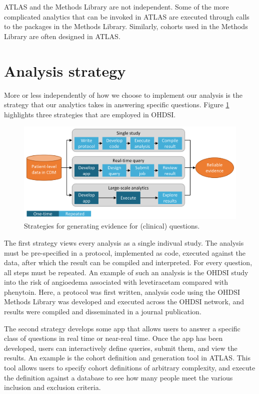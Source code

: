 \documentclass[11pt]{book}
\begin{document}
ATLAS and the Methods Library are not independent. Some of the more
complicated analytics that can be invoked in ATLAS are executed through
calls to the packages in the Methods Library. Similarly, cohorts used in
the Methods Library are often designed in ATLAS.

\section{Analysis strategy}\label{analysis-strategy}

More or less independently of how we choose to implement our analysis is
the strategy that our analytics takes in answering specific questions.
Figure \ref{fig:strategies} highlights three strategies that are
employed in OHDSI.

\begin{figure}

{\centering \includegraphics[width=0.9\linewidth]{images/OhdsiAnalyticsTools/strategies} 

}

\caption{Strategies for generating evidence for (clinical) questions.}\label{fig:strategies}
\end{figure}

The first strategy views every analysis as a single indivual study. The
analysis must be pre-specified in a protocol, implemented as code,
executed against the data, after which the result can be compiled and
interpreted. For every question, all steps must be repeated. An example
of such an analysis is the OHDSI study into the risk of angioedema
associated with levetiracetam compared with phenytoin. \citep{duke_2017}
Here, a protocol was first written, analysis code using the OHDSI
Methods Library was developed and executed across the OHDSI network, and
results were compiled and disseminated in a journal publication.

The second strategy develops some app that allows users to answer a
specific class of questions in real time or near-real time. Once the app
has been developed, users can interactively define queries, submit them,
and view the results. An example is the cohort definition and generation
tool in ATLAS. This tool allows users to specify cohort definitions of
arbitrary complexity, and execute the definition against a database to
see how many people meet the various inclusion and exclusion criteria.
\end{document}
